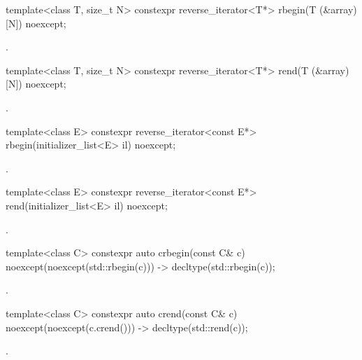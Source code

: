 %
\begin{itemdecl}
template<class T, size_t N> constexpr reverse_iterator<T*> rbegin(T (&array)[N]) noexcept;
\end{itemdecl}
\begin{itemdescr}
\pnum
\returns
{}.
\end{itemdescr}

%
\begin{itemdecl}
template<class T, size_t N> constexpr reverse_iterator<T*> rend(T (&array)[N]) noexcept;
\end{itemdecl}
\begin{itemdescr}
\pnum
\returns
{}.
\end{itemdescr}

%
\begin{itemdecl}
template<class E> constexpr reverse_iterator<const E*> rbegin(initializer_list<E> il) noexcept;
\end{itemdecl}
\begin{itemdescr}
\pnum
\returns
{}.
\end{itemdescr}

%
\begin{itemdecl}
template<class E> constexpr reverse_iterator<const E*> rend(initializer_list<E> il) noexcept;
\end{itemdecl}
\begin{itemdescr}
\pnum
\returns
{}.
\end{itemdescr}

%
\begin{itemdecl}
template<class C> constexpr auto crbegin(const C& c) noexcept(noexcept(std::rbegin(c)))
  -> decltype(std::rbegin(c));
\end{itemdecl}
\begin{itemdescr}
\pnum
\returns
{}.
\end{itemdescr}

%
\begin{itemdecl}
template<class C> constexpr auto crend(const C& c) noexcept(noexcept(c.crend()))
  -> decltype(std::rend(c));
\end{itemdecl}
\begin{itemdescr}
\pnum
\returns
{}.
\end{itemdescr}

